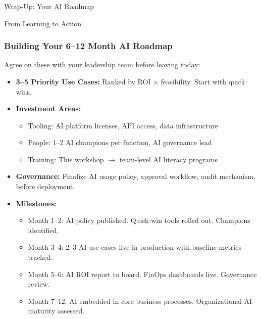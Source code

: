 \begin{frame}[fragile]\frametitle{}
\begin{center}
{\Large Wrap-Up: Your AI Roadmap}

{\small From Learning to Action}
\end{center}
\end{frame}

\begin{frame}[fragile]\frametitle{Building Your 6--12 Month AI Roadmap}

Agree on these with your leadership team before leaving today:
\begin{itemize}
  \item \textbf{3--5 Priority Use Cases:} Ranked by ROI $\times$ feasibility. Start with quick wins.
  \item \textbf{Investment Areas:}
    \begin{itemize}
      \item Tooling: AI platform licenses, API access, data infrastructure
      \item People: 1--2 AI champions per function, AI governance lead
      \item Training: This workshop $\rightarrow$ team-level AI literacy programs
    \end{itemize}
  \item \textbf{Governance:} Finalize AI usage policy, approval workflow, audit mechanism, before deployment.
  \item \textbf{Milestones:}
    \begin{itemize}
      \item Month 1--2: AI policy published. Quick-win tools rolled out. Champions identified.
      \item Month 3--4: 2--3 AI use cases live in production with baseline metrics tracked.
      \item Month 5--6: AI ROI report to board. FinOps dashboards live. Governance review.
      \item Month 7--12: AI embedded in core business processes. Organizational AI maturity assessed.
    \end{itemize}
\end{itemize}

\end{frame}

